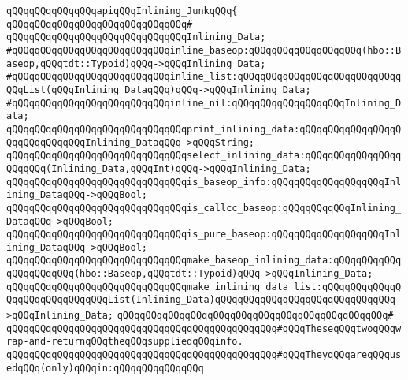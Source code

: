 \newline
\verb|qQQqqQQqqQQqqQQqapiqQQqInlining_JunkqQQq{|\newline
\verb|qQQqqQQqqQQqqQQqqQQqqQQqqQQqqQQq#|\newline
\verb|qQQqqQQqqQQqqQQqqQQqqQQqqQQqqQQqInlining_Data;|\newline
\newline
\verb|#qQQqqQQqqQQqqQQqqQQqqQQqqQQqinline_baseop:qQQqqQQqqQQqqQQqqQQq(hbo::Baseop,qQQqtdt::Typoid)qQQq->qQQqInlining_Data;|\newline
\verb|#qQQqqQQqqQQqqQQqqQQqqQQqqQQqinline_list:qQQqqQQqqQQqqQQqqQQqqQQqqQQqqQQqList(qQQqInlining_DataqQQq)qQQq->qQQqInlining_Data;|\newline
\verb|#qQQqqQQqqQQqqQQqqQQqqQQqqQQqinline_nil:qQQqqQQqqQQqqQQqqQQqInlining_Data;|\newline
\newline
\newline
\verb|qQQqqQQqqQQqqQQqqQQqqQQqqQQqqQQqprint_inlining_data:qQQqqQQqqQQqqQQqqQQqqQQqqQQqqQQqInlining_DataqQQq->qQQqString;|\newline
\verb|qQQqqQQqqQQqqQQqqQQqqQQqqQQqqQQqselect_inlining_data:qQQqqQQqqQQqqQQqqQQqqQQq(Inlining_Data,qQQqInt)qQQq->qQQqInlining_Data;|\newline
\newline
\verb|qQQqqQQqqQQqqQQqqQQqqQQqqQQqqQQqis_baseop_info:qQQqqQQqqQQqqQQqqQQqInlining_DataqQQq->qQQqBool;|\newline
\verb|qQQqqQQqqQQqqQQqqQQqqQQqqQQqqQQqis_callcc_baseop:qQQqqQQqqQQqInlining_DataqQQq->qQQqBool;|\newline
\verb|qQQqqQQqqQQqqQQqqQQqqQQqqQQqqQQqis_pure_baseop:qQQqqQQqqQQqqQQqqQQqInlining_DataqQQq->qQQqBool;|\newline
\newline
\verb|qQQqqQQqqQQqqQQqqQQqqQQqqQQqqQQqmake_baseop_inlining_data:qQQqqQQqqQQqqQQqqQQqqQQq(hbo::Baseop,qQQqtdt::Typoid)qQQq->qQQqInlining_Data;|\newline
\verb|qQQqqQQqqQQqqQQqqQQqqQQqqQQqqQQqmake_inlining_data_list:qQQqqQQqqQQqqQQqqQQqqQQqqQQqqQQqList(Inlining_Data)qQQqqQQqqQQqqQQqqQQqqQQqqQQqqQQq->qQQqInlining_Data;|\newline
\verb|qQQqqQQqqQQqqQQqqQQqqQQqqQQqqQQqqQQqqQQqqQQqqQQq#|\newline
\verb|qQQqqQQqqQQqqQQqqQQqqQQqqQQqqQQqqQQqqQQqqQQqqQQq#qQQqTheseqQQqtwoqQQqwrap-and-returnqQQqtheqQQqsuppliedqQQqinfo.|\newline
\verb|qQQqqQQqqQQqqQQqqQQqqQQqqQQqqQQqqQQqqQQqqQQqqQQq#qQQqTheyqQQqareqQQqusedqQQq(only)qQQqin:qQQqqQQqqQQqqQQq|\newline
